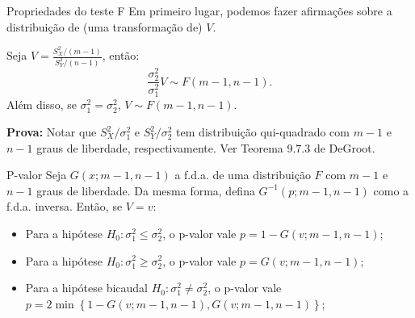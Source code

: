  \begin{frame}{Propriedades do teste F}
  Em primeiro lugar, podemos fazer afirmações sobre a distribuição de (uma transformação de) $V$.
  \begin{theo}[A distribuição de $V$]
   Seja $V = \frac{S_X^2/(m-1)}{S_Y^2/(n-1)}$, então:
   \begin{equation*}
    \frac{\sigma_2^2}{\sigma_1^2} V \sim F(m-1, n-1).
   \end{equation*}
   Além disso, se $\sigma_1^2 = \sigma_2^2$, $V \sim F(m-1, n-1)$. 
  \end{theo}
\textbf{Prova:} Notar que $S_X^2/\sigma_1^2$ e $S_Y^2/\sigma_2^2$  tem distribuição qui-quadrado com $m-1$ e $n-1$ graus de liberdade, respectivamente.
Ver Teorema 9.7.3 de DeGroot.
 \end{frame}
 
 \begin{frame}{P-valor}
  Seja $G(x; m-1, n-1)$ a f.d.a. de uma distribuição $F$ com $m-1$ e $n-1$ graus de liberdade.
  Da mesma forma, defina $G^{-1}(p; m-1, n-1)$ como a f.d.a. inversa.
  Então, se $V = v$:
  \begin{itemize}
   \item Para a hipótese $H_0: \sigma_1^2 \leq \sigma_2^2$, o p-valor vale $p = 1-G(v; m-1, n-1)$;
   \item Para a hipótese $H_0: \sigma_1^2 \geq \sigma_2^2$, o p-valor vale $p = G(v; m-1, n-1)$;
   \item Para a hipótese bicaudal $H_0: \sigma_1^2 \neq \sigma_2^2$, o p-valor vale $p = 2\min\left\{1-G(v; m-1, n-1), G(v; m-1, n-1)\right\}$;
  \end{itemize}
 \end{frame}
 
